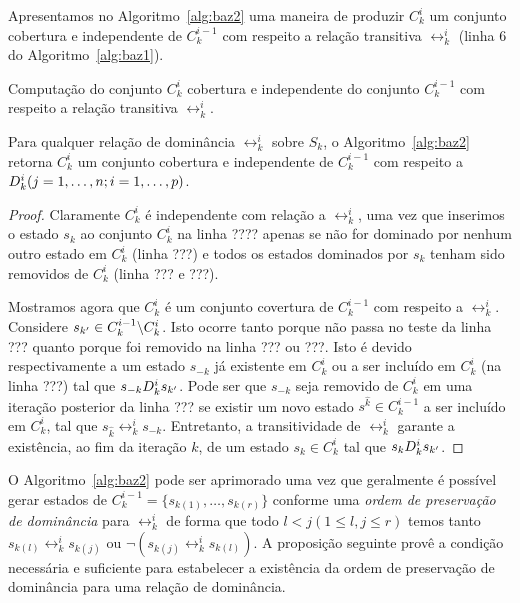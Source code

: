 Apresentamos no Algoritmo~\ref{alg:baz2} uma maneira de produzir $C_k^i$ um
conjunto cobertura e independente de $C_k^{i-1}$ com respeito a relação
transitiva $\rel_k^i$ (linha 6 do Algoritmo~\ref{alg:baz1}).

\begin{algorithm}
  \caption{Computação do conjunto $C_k^i$ cobertura e independente do conjunto
  $C_k^{i-1}$ com respeito a relação transitiva $\rel_k^i$.}
  \label{alg:baz2}
  
\end{algorithm}

\begin{myprop}
  Para qualquer relação de dominância $\rel_k^i$ sobre $S_k$, o
  Algoritmo~\ref{alg:baz2} retorna $C_k^i$ um conjunto cobertura e independente
  de $C_k^{i-1}$ com respeito a $D_k^i (j = 1, \ldots, n; i = 1, \ldots, p)$.
\end{myprop}

\begin{proof}
  Claramente $C_k^i$ é independente com relação a $\rel_k^i$, uma vez que
  inserimos o estado $s_k$ ao conjunto $C_k^i$ na linha ????
  apenas se não for dominado por nenhum outro estado em $C_k^i$ (linha ???)
  e todos os estados dominados por $s_k$ tenham sido removidos de $C_k^i$
  (linha ??? e ???).

  Mostramos agora que $C_k^i$ é um conjunto covertura de $C_k^{i-1}$
  com respeito a $\rel_k^i$.
  Considere $s_{{k'}} \in C_k^{i-1} \backslash C_k^i$.
  Isto ocorre tanto porque não passa no teste da linha ??? quanto porque
  foi removido na linha ??? ou ???.
  Isto é devido respectivamente a um estado $s_{-k}$ já existente em $C_k^i$
  ou a ser incluído em $C_k^i$ (na linha ???) tal que $s_{-k}D_k^i s_{{k'}}$.
  Pode ser que $s_{-k}$ seja removido de $C_k^i$ em uma iteração posterior
  da linha ??? se existir um novo estado $s^{\hat k} \in C_k^{i-1}$ a ser
  incluído em $C_k^i$, tal que $s_{\hat k} \rel_k^i s_{-k}$.
  Entretanto, a transitividade de $\rel_k^i$ garante a existência, ao fim da
  iteração $k$, de um estado $s_k \in C_k^i$ tal que $s_k D_k^i s_{{k'}}$.
  \qedhere
\end{proof}

O Algoritmo~\ref{alg:baz2} pode ser aprimorado uma vez que geralmente é possível
gerar estados de $C_k^{i-1} = \{s_{k(1)}, \ldots, s_{k(r)}\}$ conforme
uma \emph{ordem de preservação de dominância} para $\rel_k^i$ de forma que
todo $l < j (1 \leq l, j \leq r)$ temos tanto $s_{k(l)} \rel_k^i s_{k(j)}$
ou $\neg (s_{k(j)} \rel_k^i s_{k(l)})$.
A proposição seguinte provê a condição necessária e suficiente para estabelecer
a existência da ordem de preservação de dominância para uma relação de dominância.

